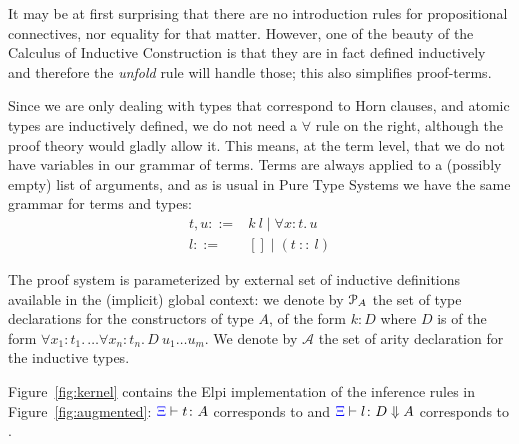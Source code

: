 It may be at first surprising that there are no introduction rules for
propositional connectives, nor equality for that matter. However, one of the beauty of the Calculus of Inductive Construction is that they are in fact defined inductively and therefore the \emph{unfold} rule will handle those; this also simplifies proof-terms.

Since we are only dealing with types that correspond to Horn clauses, and
atomic types are inductively defined, we do not need a $\forall$ rule on the right, although the proof theory would gladly allow it. This means, at the term level, that we
do not have variables in our grammar of terms. Terms are always
applied to a (possibly empty) list of arguments, and as is usual in Pure Type
Systems we have the same grammar for terms and types:
\begin{align*}
t,u ::= & k\ l \;|\; \forall x : t.\, u \\
l ::= & [] \;|\; (t\ ::\ l)
\end{align*}

The proof system is parameterized by  external set of inductive definitions available in
the (implicit) global context: we denote by ${\mathcal P}_A$ the set of type declarations for the
constructors of type $A$, of the form $k : D$ where $D$ is of the form
$\forall x_1 : t_1.\, \dots \forall x_n : t_n.\, D\ u_1 \dots u_m$. We denote
by $\mathcal{A}$ the set of arity declaration for the inductive types.

%
%

Figure~\ref{fig:kernel} contains the Elpi implementation of the
inference rules in Figure~\ref{fig:augmented}: ${\color{blue}{\Xi}}\vdash t \colon A$ corresponds to
 and ${\color{blue}{\Xi}}\vdash l \colon D \Downarrow A$ corresponds to
.

